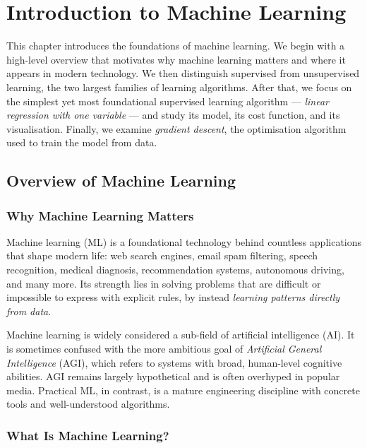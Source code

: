 \chapter{Introduction to Machine Learning}

This chapter introduces the foundations of machine learning. We begin with a
high-level overview that motivates why machine learning matters and where it
appears in modern technology. We then distinguish supervised from unsupervised
learning, the two largest families of learning algorithms. After that, we focus
on the simplest yet most foundational supervised learning algorithm ---
\emph{linear regression with one variable} --- and study its model, its cost
function, and its visualisation. Finally, we examine \emph{gradient descent},
the optimisation algorithm used to train the model from data.

\section{Overview of Machine Learning}

\subsection{Why Machine Learning Matters}

Machine learning (ML) is a foundational technology behind countless applications
that shape modern life: web search engines, email spam filtering, speech
recognition, medical diagnosis, recommendation systems, autonomous driving, and
many more. Its strength lies in solving problems that are difficult or impossible
to express with explicit rules, by instead \emph{learning patterns directly from
data}.

Machine learning is widely considered a sub-field of artificial intelligence
(AI). It is sometimes confused with the more ambitious goal of
\emph{Artificial General Intelligence} (AGI), which refers to systems with
broad, human-level cognitive abilities. AGI remains largely hypothetical and is
often overhyped in popular media. Practical ML, in contrast, is a mature
engineering discipline with concrete tools and well-understood algorithms.

\subsection{What Is Machine Learning?}

